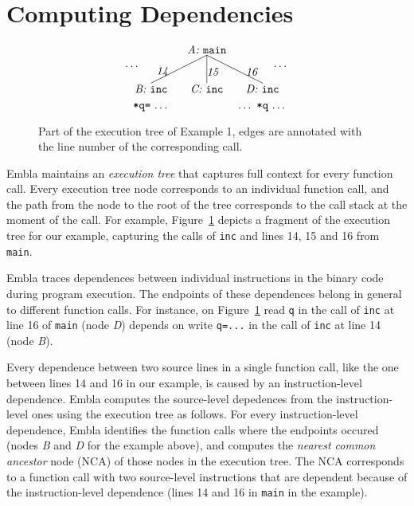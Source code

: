 \documentclass[times, 10pt,twocolumn]{article}
\begin{document}


\section{Computing Dependencies}   \label{snca}

\begin{figure} \small
\hrulefill
\[
\begin{picture}(160,60)(70,15)
\put(120,65){\makebox(60,10)[c]{\it A:\ \tt main}}
\put(150,65){\line(-2,-1){50}}
\put(150,65){\line( 0,-1){25}}
\put(150,65){\line( 2,-1){50}}
\put(95,45){\makebox(20,10)[r]{\it 14}}
\put(150,45){\makebox(20,10)[l]{\it 15}}
\put(185,45){\makebox(20,10)[l]{\it 16}}
\put(70,50){\makebox(20,10)[r]{\ldots}}
\put(210,50){\makebox(20,10)[l]{\ldots}}
\put(170,30){\makebox(60,10)[c]{\it D:\ \tt inc}}
\put(120,30){\makebox(60,10)[c]{\it C:\ \tt inc}}
\put(70,30){\makebox(60,10)[c]{\it B:\ \tt inc}}
\put(70,15){\makebox(60,10)[cb]{{\tt *q=}\ \ldots}}
\put(170,15){\makebox(60,10)[cb]{\ldots\ {\tt *q}\ \ldots}}
\end{picture}
\]
\hrulefill
\caption{Part of the execution tree of Example 1, edges are annotated 
with the line number of the corresponding call.} 
\label{ffextree}
\end{figure}

Embla maintains an {\em execution tree} that captures full context for
every function call. Every execution tree node corresponds to an
individual function call, and the path from the node to the root of the
tree corresponds to the call stack at the moment of the call. For
example, Figure~\ref{ffextree} depicts a fragment of the execution tree
for our example, capturing the calls of {\tt inc} and lines 14, 15 and
16 from {\tt main}.

Embla traces dependences between individual instructions in the binary
code during program execution. The endpoints of these dependences belong
in general to different function calls. For instance, on
Figure~\ref{ffextree} read {\tt *q} in the call of {\tt inc} at line 16
of {\tt main} (node {\it D}) depends on write {\tt *q=...} in the call
of {\tt inc} at line 14 (node {\it B}).

Every dependence between two source lines in a single function call,
like the one between lines 14 and 16 in our example, is caused by an
instruction-level dependence. Embla computes the source-level depedences
from the instruction-level ones using the execution tree as follows. For
every instruction-level dependence, Embla identifies the function calls
where the endpoints occured (nodes {\it B} and {\it D} for the example
above), and computes the {\em nearest common ancestor} node (NCA) of
those nodes in the execution tree. The NCA corresponds to a function
call with two source-level instructions that are dependent because of
the instruction-level dependence (lines 14 and 16 in {\tt main} in the
example).
\end{document}

